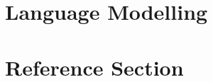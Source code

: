 \documentclass[a4paper,oneside]{book}
\begin{document}






























\part{Language Modelling}














\part{Reference Section}
























































\end{document}
